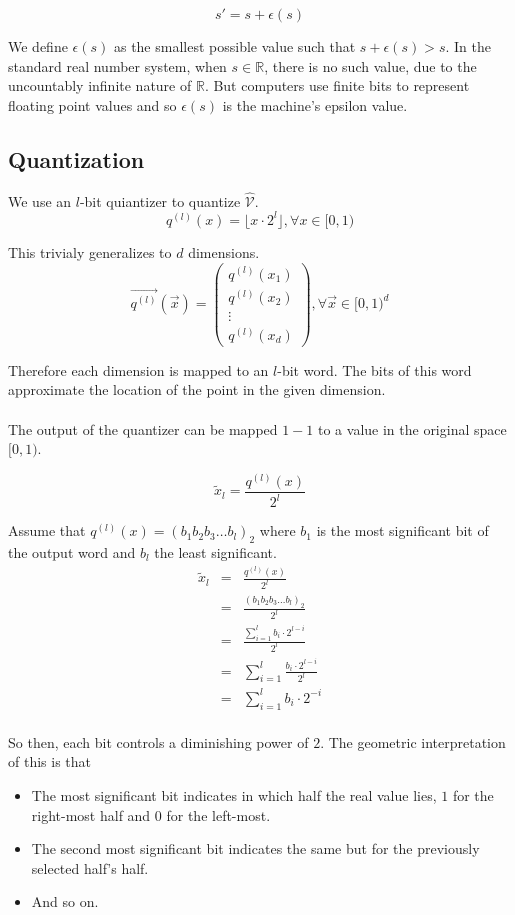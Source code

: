 \documentclass{juliacon}
\begin{document}
$$ s' = s + \epsilon(s) $$

We define $\epsilon(s)$ as the smallest possible value such that $s + \epsilon(s) > s$.
In the standard real number system, when $s \in \mathbb{R}$, there is no such value,
due to the uncountably infinite nature of $\mathbb{R}$. But computers use finite bits
to represent floating point values and so $\epsilon(s)$ is the machine's epsilon value.

\subsection{Quantization}
We use an $l$-bit quiantizer to quantize $\hat{\mathcal{V}}$.
$$q^{(l)}(x) = \lfloor x \cdot 2^l \rfloor, \forall x \in [0, 1)$$

This trivialy generalizes to $d$ dimensions.
$$\vec{q^{(l)}}(\vec{x}) = \begin{pmatrix}
  q^{(l)}(x_1)\\
  q^{(l)}(x_2)\\
  \vdots \\
  q^{(l)}(x_d)
\end{pmatrix}, \forall \vec{x} \in [0,1)^d$$

Therefore each dimension is mapped to an $l$-bit word. The bits of
this word approximate the location of the point in the given
dimension.
\\\\
The output of the quantizer can be mapped $1-1$ to a value in the
original space $[0,1)$.

$$ \tilde{x}_l = \frac{q^{(l)}(x)}{2^l} $$

Assume that $q^{(l)}(x) = (b_1b_2b_3\dots b_l)_2$ where $b_1$ is the most significant
bit of the output word and $b_l$ the least significant.
$$
\begin{matrix}
  \tilde{x}_l & = & \frac{q^{(l)}(x)}{2^l} \\
              & = & \frac{(b_1b_2b_3\dots b_l)_2}{2^l} \\
              & = & \frac{\sum\limits_{i=1}^{l} b_i \cdot 2^{l-i}}{2^l} \\
              & = & \sum\limits_{i=1}^{l}\frac{b_i \cdot 2^{l-i}}{2^l} \\
              & = & \sum\limits_{i=1}^{l}b_i \cdot 2^{-i} \\
\end{matrix}
$$

So then, each bit controls a diminishing power of $2$. The geometric interpretation of
this is that
\begin{itemize}
  \item The most significant bit indicates in which half the real value lies, $1$
  for the right-most half and $0$ for the left-most.
  \item The second most significant bit indicates the same but for the previously
  selected half's half.
  \item And so on.
\end{itemize}
\end{document}
